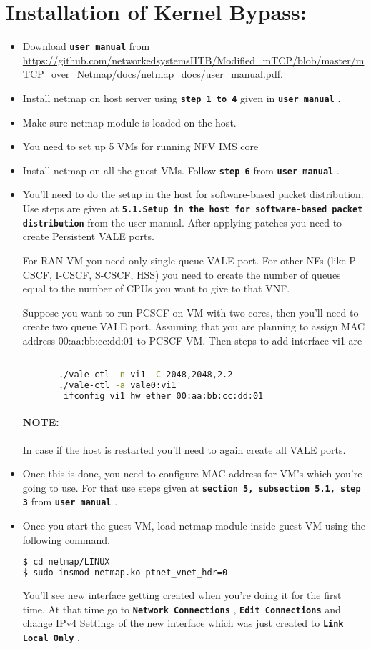\documentclass[hidelinks]{report}
\newcommand{\cf}[1] {
	\textbf{\texttt{#1}}
}
\begin{document}
\section*{Installation of Kernel Bypass:}
\begin{itemize}
\item Download \cf{user manual} from \url{https://github.com/networkedsystemsIITB/Modified_mTCP/blob/master/mTCP_over_Netmap/docs/netmap_docs/user_manual.pdf}. 
\item Install netmap on host server using \cf{step 1 to 4} given in \cf{user manual}.
\item Make sure netmap module is loaded on the host.
\item You need to set up 5 VMs for running NFV IMS core

\item Install netmap on all the guest VMs. Follow \cf{step 6} from \cf{user manual}.

\item You'll need to do the setup in the host for software-based packet distribution. Use steps are given at \cf{5.1.Setup in the host for software-based packet distribution} from the user manual. After applying patches you need to create Persistent VALE ports. 

For RAN VM you need only single queue VALE port. For other NFs (like P-CSCF, I-CSCF, S-CSCF, HSS) you need to create the number of queues equal to the number of CPUs you want to give to that VNF.  

Suppose you want to run PCSCF on VM with two cores, then you'll need to create two queue VALE port. Assuming that you are planning to assign MAC address 00:aa:bb:cc:dd:01 to PCSCF VM. 
Then steps to add interface vi1 are
\begin{lstlisting}[language=bash]

       ./vale-ctl -n vi1 -C 2048,2048,2.2
       ./vale-ctl -a vale0:vi1 
        ifconfig vi1 hw ether 00:aa:bb:cc:dd:01
\end{lstlisting}

\paragraph*{NOTE:} In case if the host is restarted you'll need to again create all VALE ports. 
\item Once this is done, you need to configure MAC address for VM's which you're going to use. For that use steps given at \cf{section 5, subsection 5.1, step 3} from \cf{user manual}.
\item Once you start the guest VM, load netmap module inside guest VM using the following command. 
\begin{lstlisting}[language=bash]
$ cd netmap/LINUX
$ sudo insmod netmap.ko ptnet_vnet_hdr=0
\end{lstlisting}
You'll see new interface getting created when you're doing it for the first time. At that time go to \cf{Network Connections}, \cf{Edit Connections} and change IPv4 Settings of the new interface which was just created to \cf{Link Local Only}. 


\end{itemize}
\end{document}
